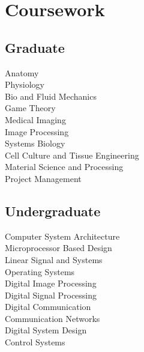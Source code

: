 \documentclass[letterpaper]{deedy-resume} %
\begin{document}
\begin{minipage}[t]{0.33\textwidth}

\section{Coursework}

\subsection{Graduate}

Anatomy \\
Physiology \\
Bio and Fluid Mechanics \\
Game Theory \\
Medical Imaging \\
Image Processing \\
Systems Biology \\
Cell Culture and Tissue Engineering \\
Material Science and Processing \\
Project Management \\

\sectionspace %


\subsection{Undergraduate}


Computer System Architecture \\
Microprocessor Based Design \\
Linear Signal and Systems \\
Operating Systems \\
Digital Image Processing \\
Digital Signal Processing \\
Digital Communication \\
Communication Networks \\
Digital System Design \\
Control Systems \\

\sectionspace %



\end{minipage}
\end{document}
